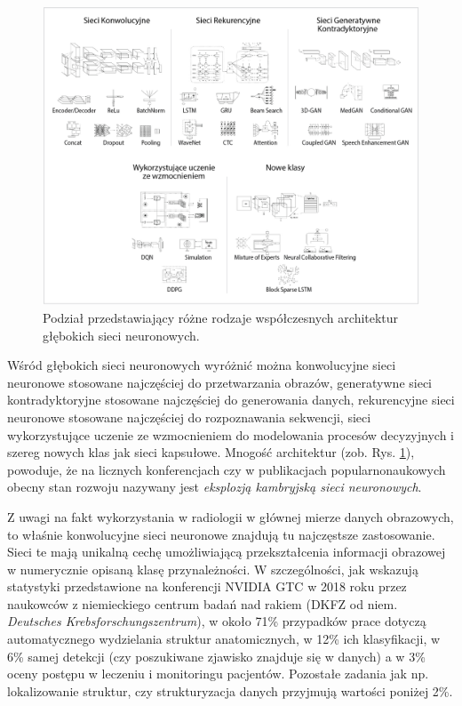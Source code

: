 \begin{figure}[h]
	\centering
	\includegraphics[width=1\textwidth]{figures/rodzajeSieciNeuronowych.png}
	\caption{Podział przedstawiający różne rodzaje współczesnych architektur głębokich sieci neuronowych.}
	\label{DLcambrianExplosion}
\end{figure}

Wśród głębokich sieci neuronowych wyróżnić można konwolucyjne sieci neuronowe stosowane najczęściej do przetwarzania obrazów, generatywne sieci kontradyktoryjne stosowane najczęściej do generowania danych, rekurencyjne sieci neuronowe stosowane najczęściej do rozpoznawania sekwencji, sieci wykorzystujące uczenie \linebreak ze wzmocnieniem do modelowania procesów decyzyjnych i szereg nowych klas jak sieci kapsułowe. Mnogość architektur (zob. Rys. \ref{DLcambrianExplosion}), powoduje, że na licznych konferencjach czy w publikacjach popularnonaukowych obecny stan rozwoju nazywany jest \textit{eksplozją kambryjską sieci neuronowych}. 


Z uwagi na fakt wykorzystania w radiologii w głównej mierze danych obrazowych, to właśnie konwolucyjne sieci neuronowe znajdują tu najczęstsze zastosowanie. Sieci te mają unikalną cechę umożliwiającą przekształcenia informacji obrazowej w numerycznie opisaną klasę przynależności. W szczególności, jak wskazują statystyki przedstawione na konferencji NVIDIA GTC w 2018 roku przez naukowców z niemieckiego centrum badań nad rakiem (DKFZ od niem. \textit{Deutsches Krebsforschungszentrum}), w około 71\% przypadków prace dotyczą automatycznego wydzielania struktur anatomicznych, w 12\% ich klasyfikacji, w 6\% samej detekcji (czy poszukiwane zjawisko znajduje się w danych) a w 3\% oceny postępu w leczeniu i monitoringu pacjentów. Pozostałe zadania jak np. lokalizowanie struktur, czy strukturyzacja danych przyjmują wartości poniżej 2\%.


